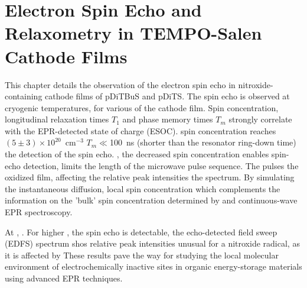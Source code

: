 \chapter{Electron Spin Echo and Relaxometry in TEMPO-Salen Cathode Films}
\label{ch:JMRO}


This chapter details the observation of the electron spin echo in nitroxide-containing cathode films of pDiTBuS and pDiTS. The spin echo is observed at cryogenic temperatures, for various  of the cathode film. Spin concentration, longitudinal relaxation times $T_1$ and phase memory times $T_m$ strongly correlate with the EPR-detected state of charge (ESOC).   spin concentration reaches $\left(5\pm3\right)\times10^{20}$~cm$^{-3}$ $T_m\ll$100~ns (shorter than the resonator ring-down time)  the detection of the spin echo. , the decreased spin concentration    enables spin-echo detection,  limits the length of the microwave pulse sequence. The  pulses  the oxidized film, affecting the relative peak intensities  the  spectrum. By simulating the  instantaneous diffusion,  local spin concentration\q{,} which complements the information on the 'bulk' spin concentration determined by  and continuous-wave EPR spectroscopy.\\

\par
At , . For higher , the spin echo is detectable,  the echo-detected field sweep (EDFS) spectrum shos relative peak intensities unusual for a nitroxide radical, as it is affected by  These results pave the way for studying the local molecular environment of electrochemically inactive sites in organic energy-storage materials using advanced EPR techniques.

